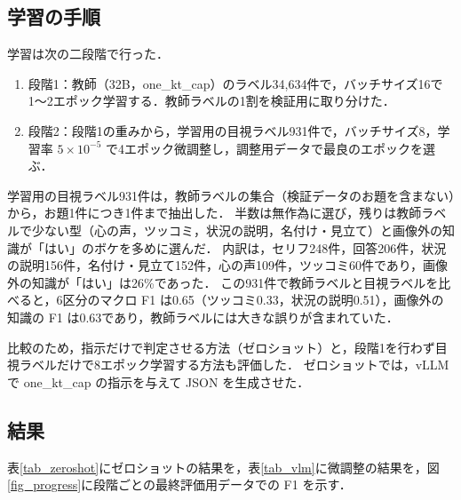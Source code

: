 \subsection{学習の手順}
学習は次の二段階で行った．
\begin{enumerate}
    \item 段階1：教師（32B，one\_kt\_cap）のラベル34,634件で，バッチサイズ16で1〜2エポック学習する．教師ラベルの1割を検証用に取り分けた．
    \item 段階2：段階1の重みから，学習用の目視ラベル931件で，バッチサイズ8，学習率 $ 5 \times 10^{-5} $ で4エポック微調整し，調整用データで最良のエポックを選ぶ．
\end{enumerate}
学習用の目視ラベル931件は，教師ラベルの集合（検証データのお題を含まない）から，お題1件につき1件まで抽出した．
半数は無作為に選び，残りは教師ラベルで少ない型（心の声，ツッコミ，状況の説明，名付け・見立て）と画像外の知識が「はい」のボケを多めに選んだ．
内訳は，セリフ248件，回答206件，状況の説明156件，名付け・見立て152件，心の声109件，ツッコミ60件であり，画像外の知識が「はい」は26\%であった．
この931件で教師ラベルと目視ラベルを比べると，6区分のマクロ F1 は0.65（ツッコミ0.33，状況の説明0.51），画像外の知識の F1 は0.63であり，教師ラベルには大きな誤りが含まれていた．

比較のため，指示だけで判定させる方法（ゼロショット）と，段階1を行わず目視ラベルだけで8エポック学習する方法も評価した．
ゼロショットでは，vLLM で one\_kt\_cap の指示を与えて JSON を生成させた．

\subsection{結果}
表\ref{tab_zeroshot}にゼロショットの結果を，表\ref{tab_vlm}に微調整の結果を，図\ref{fig_progress}に段階ごとの最終評価用データでの F1 を示す．

